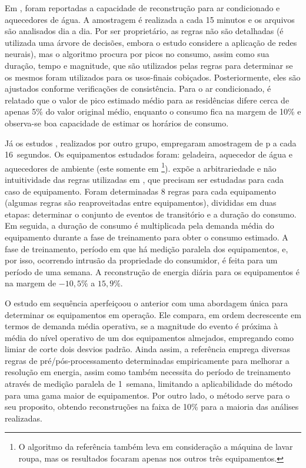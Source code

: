 \begin{enumerate}[label=\textbf{1.\arabic*},wide=\parindent]
\begin{enumerate}[label*=.\textbf{\arabic*},wide=\parindent]
Em \cite{nilm_powers_15minsamp_1991_16}, foram reportadas a capacidade
de reconstrução para ar condicionado e aquecedores de água. A
amostragem é realizada a cada 15 minutos e os arquivos são analisados
dia a dia. Por ser proprietário, as regras não são detalhadas (é
utilizada uma árvore de decisões, embora o estudo considere a aplicação
de redes neurais), mas o algoritmo procura por picos no consumo, assim
como sua duração, tempo e magnitude, que são utilizados pelas regras
para determinar se os mesmos foram utilizados para os usos-finais
cobiçados. Posteriormente, eles são ajustados conforme
verificações de consistência. Para o ar condicionado, é relatado que o
valor de pico estimado médio para as residências difere cerca de
apenas 5\% do valor original médio, enquanto o consumo fica na margem
de 10\% e observa-se boa capacidade de estimar os horários de consumo.

Já os estudos \cite{nilm_farinaccio_16ssamp_1999_17,
nilm_marceau_16ssamp_improved_1999_18}, realizados por outro
grupo, empregaram amostragem de \acs{p} a cada 16~segundos. Os
equipamentos estudados foram: geladeira, aquecedor de água e aquecedores
de ambiente (este somente em
\cite{nilm_marceau_16ssamp_improved_1999_18}\footnote{O algoritmo da
referência \cite{nilm_marceau_16ssamp_improved_1999_18}
também leva em consideração a máquina de lavar roupa, mas os
resultados focaram apenas nos outros três equipamentos.}).
\cite{nilm_zeifman_review_2011} expõe a arbitrariedade e não
intuitividade das regras utilizadas em
\cite{nilm_farinaccio_16ssamp_1999_17}, que precisam ser estudadas
para cada caso de equipamento. Foram determinadas 8 regras para cada
equipamento (algumas regras são reaproveitadas entre equipamentos),
divididas em duas etapas: determinar o conjunto de eventos de
transitório e a duração do consumo.  Em seguida, a duração de consumo é
multiplicada pela demanda média do equipamento durante a fase de
treinamento para obter o consumo estimado. A fase de treinamento,
período em que há medição paralela dos equipamentos, e, por isso,
ocorrendo intrusão da propriedade do consumidor, é feita para um
período de uma semana. A reconstrução de energia diária para os
equipamentos é na margem de $-10,5\%$ a $15,9\%$.

O estudo em sequência aperfeiçoou o anterior com uma abordagem única
para determinar os equipamentos em operação. Ele compara, em ordem
decrescente em termos de demanda média operativa, se a magnitude
do evento é próxima à média do nível operativo de um dos equipamentos
almejados, empregando como limiar de corte dois desvios padrão. Ainda
assim, a referência emprega diversas regras de pré/pós-processamento
determinadas empiricamente para melhorar a resolução em energia, assim
como também necessita do período de treinamento através de medição
paralela de 1~semana, limitando a aplicabilidade do método para uma
gama maior de equipamentos. Por outro lado, o método serve para o seu
proposito, obtendo reconstruções na faixa de 10\% para a maioria das
análises realizadas.


\end{enumerate}
\end{enumerate}

